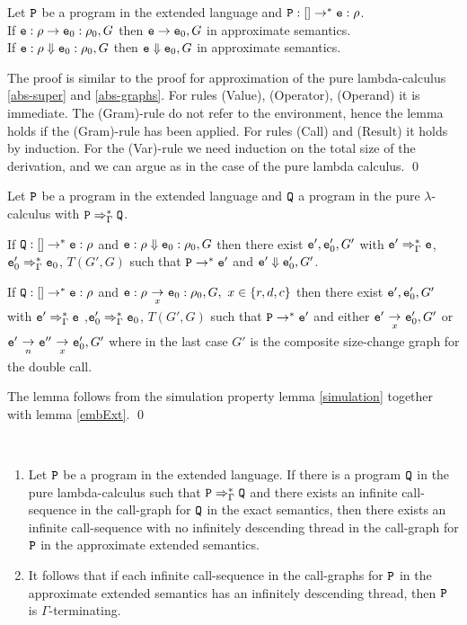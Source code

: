 \documentclass{LMCS}
\newcommand{\be}{\begin{enumerate}}
\newcommand{\blem}{\begin{lem}}
\newcommand{\elem}{\end{lem}}
\newcommand{\bprf}{\proof}
\newcommand{\eprf}{\qed}
\newcommand{\bthm}{\begin{thm}}
\newcommand{\ethm}{\end{thm}}
\theoremstyle{definition}\newtheorem{env}[thm]{Environment}
\newcommand{\tosub}[1]{\raisebox{-6.0pt}{$\ \stackrel{\textstyle\to}{\vrule height4.5 pt width0 pt
    depth2.5 pt \smash{\scriptstyle#1}}\ $}}
\begin{document}
\blem \label{embExt}
Let ${\tt P}$ be a program in the extended language and ${\tt P}:[]\to^*{\tt e}:\rho$.\\ 
If ${\tt e}:\rho\to {\tt e}_0:\rho_0,G$ then ${\tt e}\to {\tt e}_0,G$ in approximate semantics.\\
If ${\tt e}:\rho\Downarrow {\tt e}_0:\rho_0,G$ then ${\tt e}\Downarrow {\tt e}_0,G$ in approximate semantics.
\elem
\bprf
The proof is similar to the proof for approximation of the pure lambda-calculus \ref{abs-super} and \ref{abs-graphs}.
For rules (Value), (Operator), (Operand) it is immediate. The (Gram)-rule do not refer to the environment, hence the lemma holds if the (Gram)-rule has been applied. For rules (Call) and (Result) it holds by induction. For the (Var)-rule we need induction on the total size of the derivation, and we can argue as in the case of the pure lambda calculus.
\eprf


\blem \label{simulation-approx}
Let ${\tt P}$ be a program in the extended language and ${\tt Q}$ a program in the pure $\lambda$-calculus with ${\tt P}\Rightarrow^*_\Gamma {\tt Q}$.

If ${\tt Q}:[]\to^*{\tt e}:\rho$ and ${\tt e}:\rho\Downarrow {\tt e}_0:\rho_0,G$ then there 
exist ${\tt e}',{\tt e}_0',G'$ with ${\tt e}'\Rightarrow^*_\Gamma {\tt e}$, ${\tt e}_0'\Rightarrow^*_\Gamma {\tt e}_0$, $T(G',G)$ such that ${\tt P}\to^*{\tt e}'$ and ${\tt e}'\Downarrow {\tt e}_0',G'$.

If ${\tt Q}:[]\to^*{\tt e}:\rho$ and ${\tt e}:\rho\tosub{x} {\tt e}_0:\rho_0,G,\ x\in\{r,d,c\}$ then there 
exist ${\tt e}',{\tt e}_0',G'$ with ${\tt e}'\Rightarrow^*_\Gamma {\tt e}$ ,${\tt e}_0'\Rightarrow^*_\Gamma {\tt e}_0$, $T(G',G)$ such that ${\tt P}\to^*{\tt e}'$ and either ${\tt e}'\tosub{x} {\tt e}_0',G'$ or ${\tt e}'\tosub{n}{\tt e}''\tosub{x} {\tt e}_0',G'$ where in the last case $G'$ is the composite size-change graph for the double call.
\elem

\bprf The lemma follows from the simulation property lemma \ref{simulation} together with lemma \ref{embExt}.
\eprf


\bthm\label{gamma-termination}\ 
\be[\em(1)]
\item Let ${\tt P}$ be a program in the extended language. If there is a program ${\tt Q}$ in the pure lambda-calculus such that  ${\tt P}\Rightarrow^*_\Gamma {\tt Q}$ and there exists an infinite call-sequence 
in the call-graph for ${\tt Q}$ in the exact semantics, then there exists an infinite call-sequence with no infinitely descending thread in the call-graph for ${\tt P}$ in the approximate extended semantics.
\item It follows that if each infinite call-sequence  in the call-graphs for ${\tt P}$ in the approximate extended semantics has an infinitely descending thread, then ${\tt P}$ is $\Gamma$-terminating.
\end{enumerate}
\ethm
\end{document}
